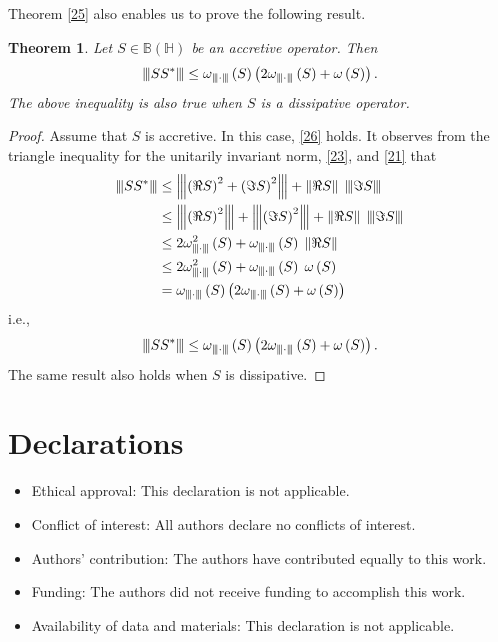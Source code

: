 \documentclass[12pt,twoside,reqno]{amsart}
\newcommand{\vertiii}[1]{{\left\vert\kern-0.25ex\left\vert\kern-0.25ex\left\vert #1 
    \right\vert\kern-0.25ex\right\vert\kern-0.25ex\right\vert}}
\newtheorem{theorem}{Theorem}[section]
\numberwithin{equation}{section}
\begin{document}
Theorem \ref{25} also enables us to prove the following result.
\begin{theorem}
Let $S\in \mathbb B\left( \mathbb H \right)$ be an accretive operator. Then
\[{{\vertiii{ S{{S}^{*}} }}}\le {{\omega }_{\vertiii{ \cdot }}}\left( S \right)\left(2 {{\omega }_{\vertiii{ \cdot }}}\left( S \right)+\omega \left( S \right) \right).\]
The above inequality is also true when $S$ is a dissipative operator.
\end{theorem}
\begin{proof}
Assume that $S$ is accretive. In this case, \eqref{26} holds. It observes from the triangle inequality for the unitarily invariant norm, \eqref{23}, and \eqref{21} that
\[\begin{aligned}
   {{\vertiii{ S{{S}^{*}} }}}&\le {{\vertiii{ {{\left( \Re S \right)}^{2}}+{{\left( \Im S \right)}^{2}} }}}+\left\| \Re S \right\|\;{{\vertiii{ \Im S }}} \\ 
 & \le {{\vertiii{ {{\left( \Re S \right)}^{2}} }}}+{{\vertiii{ {{\left( \Im S \right)}^{2}} }}}+\left\| \Re S \right\|\;{{\vertiii{ \Im S }}} \\ 
 & \le 2\omega _{\vertiii{ \cdot }}^{2}\left( S \right)+{{\omega }_{\vertiii{ \cdot }}}\left( S \right)\;\left\| \Re S \right\| \\ 
 & \le 2\omega _{\vertiii{ \cdot }}^{2}\left( S \right)+{{\omega }_{\vertiii{ \cdot }}}\left( S \right)\;\omega \left( S \right) \\ 
 & ={{\omega }_{\vertiii{ \cdot }}}\left( S \right)\left( 2{{\omega }_{\vertiii{\cdot }}}\left( S \right)+\omega \left( S \right) \right)  
\end{aligned}\]
i.e.,
\[{{\vertiii{ S{{S}^{*}} }}}\le {{\omega }_{\vertiii{ \cdot }}}\left( S \right)\left(2 {{\omega }_{\vertiii{ \cdot }}}\left( S \right)+\omega \left( S \right) \right).\]
The same result also holds when $S$ is dissipative.
\end{proof}











\section*{Declarations}
\begin{itemize}
\item Ethical approval: This declaration is not applicable.
\item Conflict of interest: All authors declare no conflicts of interest.
\item Authors' contribution: The authors have contributed equally to this work.
\item Funding: The authors did not receive funding to accomplish this work.
\item Availability of data and materials: This declaration is not applicable.
\end{itemize}
\end{document}
